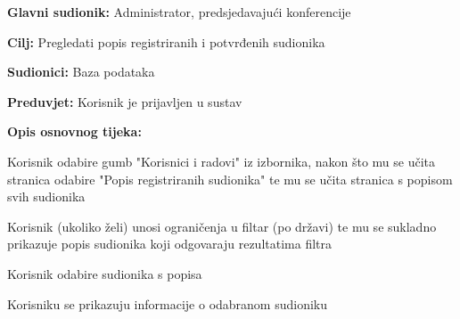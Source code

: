 					\noindent {}
					\begin{packed_item}
	
						\item \textbf{Glavni sudionik: } Administrator, predsjedavajući konferencije
						\item  \textbf{Cilj:} Pregledati popis registriranih i potvrđenih sudionika
						\item  \textbf{Sudionici:} Baza podataka
						\item  \textbf{Preduvjet:} Korisnik je prijavljen u sustav
						\item  \textbf{Opis osnovnog tijeka:}
						
						\item[] \begin{packed_enum}
	
							\item Korisnik odabire gumb "Korisnici i radovi" iz izbornika, nakon što mu se učita stranica odabire "Popis registriranih sudionika" te mu se učita stranica s popisom svih sudionika
							\item Korisnik (ukoliko želi) unosi ograničenja u filtar (po državi) te mu se sukladno prikazuje popis sudionika koji odgovaraju rezultatima filtra
							\item Korisnik odabire sudionika s popisa
							\item Korisniku se prikazuju informacije o odabranom sudioniku

					
						\end{packed_enum}
			
					\end{packed_item}


